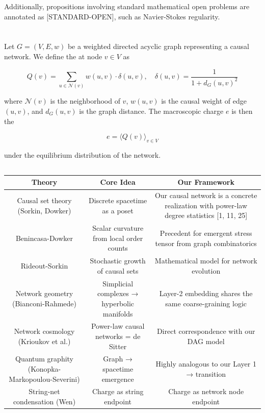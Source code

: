 \documentclass[11pt,a4paper]{article}
\theoremstyle{plain}
\theoremstyle{definition}
\begin{document}
Additionally, propositions involving standard mathematical open problems are annotated as [STANDARD-OPEN], such as Navier-Stokes regularity.

\begin{quote}\1\end{quote}

\section{\1}

\subsection{\1}

Let $G = (V, E, w)$ be a weighted directed acyclic graph representing a causal network. We define the \textbf{\1} at node $v \in V$ as

\[Q(v) = \sum_{u \in \mathcal{N}(v)} w(u,v) \cdot \delta(u,v), \quad \delta(u,v) = \frac{1}{1 + d_G(u,v)^2}\]

where $\mathcal{N}(v)$ is the neighborhood of $v$, $w(u,v)$ is the causal weight of edge $(u,v)$, and $d_G(u,v)$ is the graph distance. The macroscopic charge $e$ is then the \textbf{\1}

\[e = \langle Q(v) \rangle_{v \in V}\]

under the equilibrium distribution of the network.

\subsection{\1}

\begin{table}[h]
\centering
\begin{tabular}{|c|c|c|}
\hline
Theory & Core Idea & Our Framework \\ \hline
Causal set theory (Sorkin, Dowker) & Discrete spacetime as a poset & Our causal network is a concrete realization with power-law degree statistics [1, 11, 25] \\ \hline
Benincasa-Dowker & Scalar curvature from local order counts & Precedent for emergent stress tensor from graph combinatorics \cite{\1} \\ \hline
Rideout-Sorkin & Stochastic growth of causal sets & Mathematical model for network evolution \cite{\1} \\ \hline
Network geometry (Bianconi-Rahmede) & Simplicial complexes → hyperbolic manifolds & Layer-2 embedding shares the same coarse-graining logic \cite{\1} \\ \hline
Network cosmology (Krioukov et al.) & Power-law causal networks = de Sitter & Direct correspondence with our DAG model \cite{\1} \\ \hline
Quantum graphity (Konopka-Markopoulou-Severini) & Graph → spacetime emergence & Highly analogous to our Layer 1 → transition \cite{\1} \\ \hline
String-net condensation (Wen) & Charge as string endpoint & Charge as network node endpoint \\ \hline
\end{tabular}
\end{table}
\end{document}
